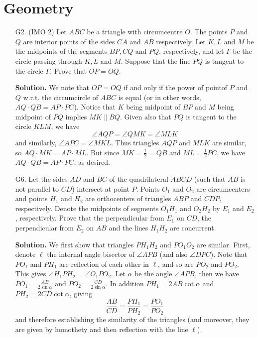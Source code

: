 \documentclass[11pt,a4paper]{article}
\begin{document}
    \section*{Geometry}
    \begin{enumerate}
    	\item [G2.] (IMO 2)
    	Let $ ABC$ be a triangle with circumcentre $ O$. The points $ P$ and $ Q$ are interior points of the sides $ CA$ and $ AB$ respectively. Let $ K,L$ and $ M$ be the midpoints of the segments $ BP,CQ$ and $ PQ$. respectively, and let $ \Gamma$ be the circle passing through $ K,L$ and $ M$. Suppose that the line $ PQ$ is tangent to the circle $ \Gamma$. Prove that $ OP = OQ.$
    	
    	\textbf{Solution.} 
    	We note that $OP=OQ$ if and only if the power of pointof $P$ and $Q$ w.r.t. the circumcircle of $ABC$ is equal (or in other words, $AQ\cdot QB = AP\cdot PC$). 
    	Notice that $K$ being midpoint of $BP$ and $M$ being midpoint of $PQ$ implies $MK\parallel BQ$. 
    	Given also that $PQ$ is tangent to the circle $KLM$, we have 
    	\[
    	\angle AQP = \angle QMK = \angle MLK
    	\]
    	and similarly, $\angle APC=\angle MKL$. 
    	Thus triangles $AQP$ and $MLK$ are similar, so 
    	$AQ\cdot MK = AP\cdot ML$. 
    	But since $MK = \frac 12 = QB$ and $ML = \frac 12 PC$, we have 
    	$AQ\cdot QB = AP\cdot PC$, as desired. 
    	
    	\item [G6.]
    	Let the sides $AD$ and $BC$ of the quadrilateral $ABCD$ (such that $AB$ is not parallel to $CD$) intersect at point $P$. Points $O_1$ and $O_2$ are circumcenters and points $H_1$ and $H_2$ are orthocenters of triangles $ABP$ and $CDP$, respectively. Denote the midpoints of segments $O_1H_1$ and $O_2H_2$ by $E_1$ and $E_2$, respectively. Prove that the perpendicular from $E_1$ on $CD$, the perpendicular from $E_2$ on $AB$ and the lines $H_1H_2$ are concurrent.
    	
    	\textbf{Solution.} 
    	We first show that triangles $PH_1H_2$ and $PO_1O_2$ are similar. 
    	First, denote $\ell$ the internal angle bisector of $\angle APB$ (and also $\angle DPC$). 
    	Note that $PO_1$ and $PH_1$ are reflection of each other in $\ell$, 
    	and so are $PO_2$ and $PO_2$. 
    	This gives $\angle H_1PH_2 = \angle O_1PO_2$. 
    	Let $\alpha$ be the angle $\angle APB$, then we have $PO_1 = \frac{AB}{2\sin \alpha}$ and $PO_2 = \frac{CD}{2\sin\alpha}$. 
    	In addition $PH_1 = 2AB\cot\alpha$ and $PH_2 = 2CD\cot\alpha$, giving 
    	\[
    	\frac{AB}{CD} = \frac{PH_1}{PH_2} = \frac{PO_1}{PO_2}
    	\]
    	and therefore establishing the similarity of the triangles (and moreover, they are given by homothety and then reflection with the line $\ell$). 
    	

\end{enumerate}
\end{document}
